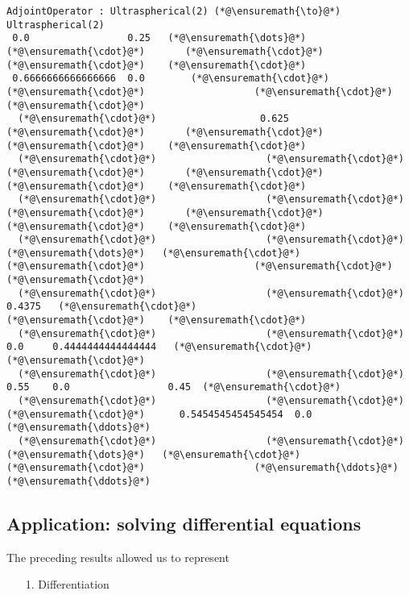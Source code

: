 \documentclass[12pt,landscape]{article}
\begin{document}
{\begin{lstlisting}
AdjointOperator : Ultraspherical(2) (*@\ensuremath{\to}@*) Ultraspherical(2)
 0.0                 0.25   (*@\ensuremath{\dots}@*)   (*@\ensuremath{\cdot}@*)       (*@\ensuremath{\cdot}@*)                   (*@\ensuremath{\cdot}@*)    (*@\ensuremath{\cdot}@*)
 0.6666666666666666  0.0        (*@\ensuremath{\cdot}@*)       (*@\ensuremath{\cdot}@*)                   (*@\ensuremath{\cdot}@*)    (*@\ensuremath{\cdot}@*)
  (*@\ensuremath{\cdot}@*)                  0.625      (*@\ensuremath{\cdot}@*)       (*@\ensuremath{\cdot}@*)                   (*@\ensuremath{\cdot}@*)    (*@\ensuremath{\cdot}@*)
  (*@\ensuremath{\cdot}@*)                   (*@\ensuremath{\cdot}@*)         (*@\ensuremath{\cdot}@*)       (*@\ensuremath{\cdot}@*)                   (*@\ensuremath{\cdot}@*)    (*@\ensuremath{\cdot}@*)
  (*@\ensuremath{\cdot}@*)                   (*@\ensuremath{\cdot}@*)         (*@\ensuremath{\cdot}@*)       (*@\ensuremath{\cdot}@*)                   (*@\ensuremath{\cdot}@*)    (*@\ensuremath{\cdot}@*)
  (*@\ensuremath{\cdot}@*)                   (*@\ensuremath{\cdot}@*)     (*@\ensuremath{\dots}@*)   (*@\ensuremath{\cdot}@*)       (*@\ensuremath{\cdot}@*)                   (*@\ensuremath{\cdot}@*)    (*@\ensuremath{\cdot}@*)
  (*@\ensuremath{\cdot}@*)                   (*@\ensuremath{\cdot}@*)        0.4375   (*@\ensuremath{\cdot}@*)                   (*@\ensuremath{\cdot}@*)    (*@\ensuremath{\cdot}@*)
  (*@\ensuremath{\cdot}@*)                   (*@\ensuremath{\cdot}@*)        0.0     0.4444444444444444   (*@\ensuremath{\cdot}@*)    (*@\ensuremath{\cdot}@*)
  (*@\ensuremath{\cdot}@*)                   (*@\ensuremath{\cdot}@*)        0.55    0.0                 0.45  (*@\ensuremath{\cdot}@*)
  (*@\ensuremath{\cdot}@*)                   (*@\ensuremath{\cdot}@*)         (*@\ensuremath{\cdot}@*)      0.5454545454545454  0.0   (*@\ensuremath{\ddots}@*)
  (*@\ensuremath{\cdot}@*)                   (*@\ensuremath{\cdot}@*)     (*@\ensuremath{\dots}@*)   (*@\ensuremath{\cdot}@*)       (*@\ensuremath{\cdot}@*)                   (*@\ensuremath{\ddots}@*)    (*@\ensuremath{\ddots}@*)
\end{lstlisting}

\subsection{Application: solving differential equations}
The preceding results allowed us to represent

\begin{itemize}
\item[1. ] Differentiation



\end{itemize}}
\end{document}
